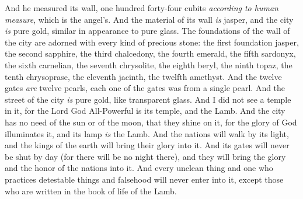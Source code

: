 \begin{biblechapter}
\verse And he measured its wall, one hundred forty-four cubits \textit{according to human measure}, which is the angel’s.
\verse And the material of its wall \textit{is} jasper, and the city \textit{is} pure gold, similar in appearance to pure glass.
\verse The foundations of the wall of the city are adorned with every kind of precious stone: the first foundation jasper, the second sapphire, the third chalcedony, the fourth emerald,
\verse the fifth sardonyx, the sixth carnelian, the seventh chrysolite, the eighth beryl, the ninth topaz, the tenth chrysoprase, the eleventh jacinth, the twelfth amethyst.
\verse And the twelve gates \textit{are} twelve pearls, each one of the gates was from a single pearl. And the street of the city \textit{is} pure gold, like transparent glass.
\verse And I did not see a temple in it, for the Lord God All-Powerful is its temple, and the Lamb.
\verse And the city has no need of the sun or of the moon, that they shine on it, for the glory of God illuminates it, and its lamp \textit{is} the Lamb.
\verse And the nations will walk by its light, and the kings of the earth will bring their glory into it.
\verse And its gates will never be shut by day (for there will be no night there),
\verse and they will bring the glory and the honor of the nations into it.
\verse And every unclean thing and one who practices detestable things and falsehood will never enter into it, except those who are written in the book of life of the Lamb.
\end{biblechapter}

